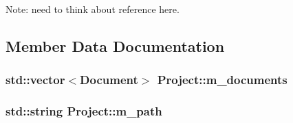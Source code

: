 Note\+: need to think about reference here. 



\subsection{Member Data Documentation}
\subsubsection[{\texorpdfstring{m\+\_\+documents}{m_documents}}]{\setlength{\rightskip}{0pt plus 5cm}std\+::vector$<${\bf Document}$>$ Project\+::m\+\_\+documents\hspace{0.3cm}{\ttfamily [private]}}\hypertarget{class_project_a9f27e95fa3e22adbdfd6b2789fb9dcf2}{}\label{class_project_a9f27e95fa3e22adbdfd6b2789fb9dcf2}
\subsubsection[{\texorpdfstring{m\+\_\+path}{m_path}}]{\setlength{\rightskip}{0pt plus 5cm}std\+::string Project\+::m\+\_\+path\hspace{0.3cm}{\ttfamily [private]}}\hypertarget{class_project_a6c6b9942014ec60bdc35bfd29d7b21fa}{}\label{class_project_a6c6b9942014ec60bdc35bfd29d7b21fa}
